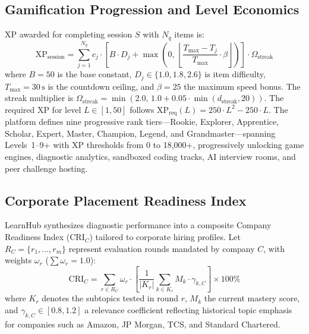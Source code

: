 \documentclass[journal]{IEEEtran}
\begin{document}
\subsection{Gamification Progression and Level Economics}
XP awarded for completing session $S$ with $N_q$ items is:
\begin{equation}
\text{XP}_{\text{session}} = \sum_{j=1}^{N_q} c_j \cdot \left[ B \cdot D_j + \max\left(0, \, \left\lfloor \frac{T_{\text{max}} - T_j}{T_{\text{max}}} \cdot \beta \right\rfloor \right) \right] \cdot \Omega_{\text{streak}}
\label{eq:xp_formula}
\end{equation}
where $B = 50$ is the base constant, $D_j \in \{1.0, 1.8, 2.6\}$ is item difficulty, $T_{\text{max}} = 30\,\text{s}$ is the countdown ceiling, and $\beta = 25$ the maximum speed bonus. The streak multiplier is $\Omega_{\text{streak}} = \min(2.0, \, 1.0 + 0.05 \cdot \min(d_{\text{streak}}, 20))$.
The required XP for level $L \in [1, 50]$ follows $\text{XP}_{\text{req}}(L) = 250 \cdot L^2 - 250 \cdot L$. The platform defines nine progressive rank tiers---Rookie, Explorer, Apprentice, Scholar, Expert, Master, Champion, Legend, and Grandmaster---spanning Levels~1--9+ with XP thresholds from 0 to 18,000+, progressively unlocking game engines, diagnostic analytics, sandboxed coding tracks, AI interview rooms, and peer challenge hosting.

\subsection{Corporate Placement Readiness Index}
LearnHub synthesizes diagnostic performance into a composite Company Readiness Index ($\text{CRI}_C$) tailored to corporate hiring profiles. Let $R_C = \{r_1, \dots, r_m\}$ represent evaluation rounds mandated by company $C$, with weights $\omega_r$ ($\sum \omega_r = 1.0$):
\begin{equation}
\text{CRI}_C = \sum_{r \in R_C} \omega_r \cdot \left[ \frac{1}{|K_r|} \sum_{k \in K_r} M_k \cdot \gamma_{k, C} \right] \times 100\%
\label{eq:cri}
\end{equation}
where $K_r$ denotes the subtopics tested in round $r$, $M_k$ the current mastery score, and $\gamma_{k, C} \in [0.8, 1.2]$ a relevance coefficient reflecting historical topic emphasis for companies such as Amazon, JP Morgan, TCS, and Standard Chartered.
\end{document}
